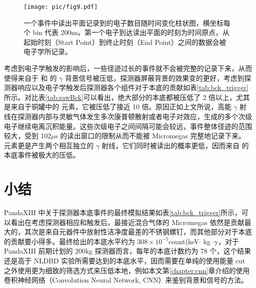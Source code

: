 \begin{figure}
    \centering
    \texttt{[image: pic/fig9.pdf]}
    \caption{一个事件中读出平面记录到的电子数目随时间变化柱状图，横坐标每个 bin 代表 200ns。第一个电子到达读出平面的时刻为时间原点，从起始时刻（Start Point）到终止时刻（End Point）之间的数据会被电子学所记录。}
    \label{fig:trigger}
\end{figure}

考虑到电子学触发的影响后，一些径迹过长的事件就不会被完整的记录下来，从而使得来自于 \utte 和 \thttt 的 $\gamma$ 背景信号被压低，探测器屏蔽背景的效果变的更好，考虑到探测器响应以及电子学触发后探测器各个组件对于本底的贡献如表\ref{tab:bck_trigger}所示。对比表\ref{tab:rawBck}可以看出，绝大部分的本底都被压低了 2 倍以上，尤其是来自于铜罐中的 \cose 元素，它被压低了接近 10 倍。原因正如上文所说，高能 $\gamma$ 射线在探测器内部与灵敏气体发生多次康普顿散射或者电子对效应，生成的多个次级电子继续电离沉积能量。这些次级电子之间间隔可能会较远，事件整体径迹的范围较大，受到 102$\mu$s 的读出窗口的限制从而不能被 Micromegas 完整地记录下来。\cose 元素更是产生两个相互独立的 $\gamma$ 射线，它们同时被读出的概率更低，因而来自 \cose 的本底事件被极大的压低。

\section{小结}

PandaXIII 中关于探测器本底事件的最终模拟结果如表\ref{tab:bck_trigger}所示，可以看出在考虑探测器相应和触发后，最接近混合气体的 Micromegas 依然是贡献最大的，其次是来自元器件中放射性洁净度最差的不锈钢螺钉，而其他部分对于本底的贡献要小得多。最终给出的本底水平约为 $308\times 10^{-5}$count\/(keV$\cdot$ kg $\cdot$y，对于 PandaXIII 前期计划的 200kg 探测器而言，每年的本底计数约为 78 个，这个结果还是高于 NLDBD 实验所需要达到的本底水平，因而需要在单纯的使用能量 cut 之外使用更为细致的筛选方式来压低本地，例如本文第\ref{chapter:cnn}章介绍的使用卷积神经网络（Convolution Neural Network, CNN）来鉴别背景和信号的方法。

